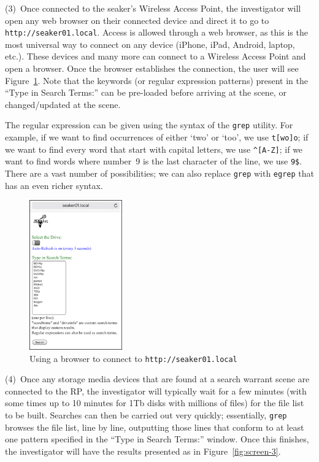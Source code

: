 \documentclass[12pt]{article}
\begin{document}
(3)~Once connected to the \gls{seaker}'s Wireless Access Point,
the investigator will open any
web browser on their connected device and direct it to go to
\verb|http://seaker01.local|. Access is allowed
through a web browser, as this is the most universal way to connect
on any device (iPhone, iPad, Android, laptop, etc.).  These
devices and many more can connect to a Wireless Access Point
and open a browser.  Once the browser establishes the
connection, the user will see Figure~\ref{fig:screen-2}. Note that the
keywords (or regular expression patterns) present in the ``Type in
Search Terms:'' can be pre-loaded before arriving at the scene, or
changed/updated at the scene.

The regular expression can be given using the syntax of the
\verb|grep| utility. For example, if we want to find occurrences of
either `two' or `too', we use \verb|t[wo]o|; if we want to find every
word that start with capital letters, we use \verb|^[A-Z]|; if we want
to find words where number~9 is the last character of the line, we use
\verb|9$|. There are a vast number of possibilities; we can also
replace \verb|grep| with \verb|egrep| that has an even richer syntax.\\

\begin{figure}[ht]
  \begin{center}
  \includegraphics[width=4cm]{images/seaker-hh-screen-2.jpg}
  \caption{Using a browser to connect to {\tt http://seaker01.local}}
  \label{fig:screen-2}
  \end{center}
\end{figure}

(4)~Once any storage media devices that are found at a search warrant scene
are connected to the RP, the investigator will typically wait for a
few minutes (with some times up to 10 minutes for 1Tb disks with
millions of files) for the file list to be built. Searches can then
be carried out very quickly; essentially, \verb|grep| browses the file
list, line by line, outputting those lines that conform to at least
one pattern specified in the ``Type in Search Terms:'' window. Once
this finishes, the investigator will have the results presented as in
Figure~\ref{fig:screen-3}.
\end{document}
